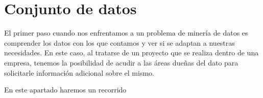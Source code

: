 \chapter{Conjunto de datos}
\label{chapter:dataset}
El primer paso cuando nos enfrentamos a un problema de minería de datos es comprender los datos con los que contamos y ver si se adaptan a nuestras necesidades. En este caso, al tratarse de un proyecto que se realiza dentro de una empresa, tenemos la posibilidad de acudir a las áreas dueñas del dato para solicitarle información adicional sobre el mismo. 

En este apartado haremos un recorrido 


